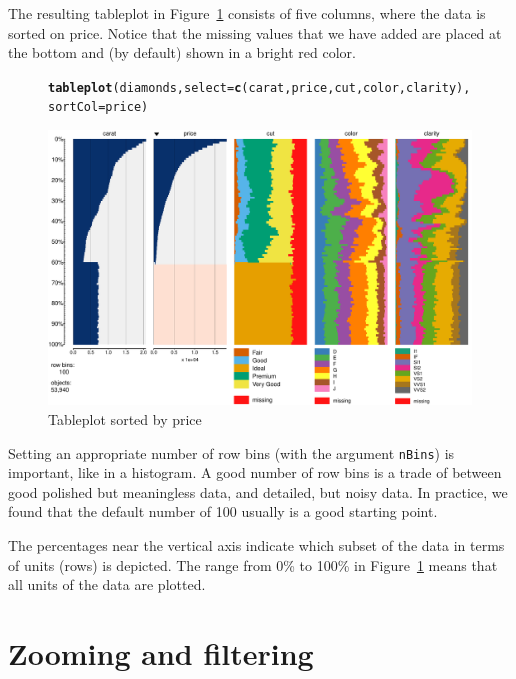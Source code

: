 \documentclass[11pt, fleqn, a4paper]{article}\usepackage{graphicx, color}
\makeatletter
\def\maxwidth{ %
  \ifdim\Gin@nat@width>\linewidth
    \linewidth
  \else
    \Gin@nat@width
  \fi
}
\newcommand{\hlfunctioncall}[1]{\textcolor[rgb]{0.501960784313725,0,0.329411764705882}{\textbf{#1}}}%
\newenvironment{kframe}{%
 \def\FrameCommand##1{\hskip\@totalleftmargin \hskip-\fboxsep
 \colorbox{shadecolor}{##1}\hskip-\fboxsep
     \hskip-\linewidth \hskip-\@totalleftmargin \hskip\columnwidth}%
 \MakeFramed {\advance\hsize-\width
   \@totalleftmargin\z@ \linewidth\hsize
   \@setminipage}}%
 {\par\unskip\endMakeFramed}
\newenvironment{knitrout}{}{} %
\makeatother
\begin{document}
The resulting tableplot in Figure~\ref{fig:tp2} consists of five columns, where the data is sorted on price. Notice that the missing values that we have added are placed at the bottom and (by default) shown in a bright red color.

\begin{figure}[!htp]
\begin{knitrout}
\color{fgcolor}\begin{kframe}
\begin{alltt}
\hlfunctioncall{tableplot}(diamonds, select = \hlfunctioncall{c}(carat, price, cut, color, clarity), 
    sortCol = price)
\end{alltt}
\end{kframe}\includegraphics[width=\maxwidth]{figure/chunk3} 
\end{knitrout}

\caption{Tableplot sorted by price}
\label{fig:tp2}
\end{figure}

Setting an appropriate number of row bins (with the argument {\tt nBins}) is important, like in a histogram. A good number of row bins is a trade of between good polished but meaningless data, and detailed, but noisy data. In practice, we found that the default number of 100 usually is a good starting point.

The percentages near the vertical axis indicate which subset of the data in terms of units (rows) is depicted. The range from 0\% to 100\% in Figure~\ref{fig:tp2} means that all units of the data are plotted.

\section{Zooming and filtering}
\end{document}
